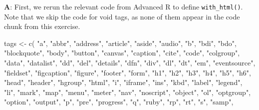 \documentclass[
]{krantz}
\makeatletter
\newenvironment{Shaded}{\begin{snugshade}}{\end{snugshade}}
\newcommand{\KeywordTok}[1]{\textcolor[rgb]{0.13,0.29,0.53}{\textbf{#1}}}
\newcommand{\NormalTok}[1]{#1}
\newcommand{\StringTok}[1]{\textcolor[rgb]{0.31,0.60,0.02}{#1}}
\newenvironment{kframe}{%
\medskip{}
\setlength{\fboxsep}{.8em}
 \def\at@end@of@kframe{}%
 \ifinner\ifhmode%
  \def\at@end@of@kframe{\end{minipage}}%
  \begin{minipage}{\columnwidth}%
 \fi\fi%
 \def\FrameCommand##1{\hskip\@totalleftmargin \hskip-\fboxsep
 \colorbox{shadecolor}{##1}\hskip-\fboxsep
     \hskip-\linewidth \hskip-\@totalleftmargin \hskip\columnwidth}%
 \MakeFramed {\advance\hsize-\width
   \@totalleftmargin\z@ \linewidth\hsize
   \@setminipage}}%
 {\par\unskip\endMakeFramed%
 \at@end@of@kframe}
\renewenvironment{Shaded}{\begin{kframe}}{\end{kframe}}
\renewcommand{\KeywordTok} [1]{\textcolor[rgb]{0.00,0.44,0.13}{{#1}}}
\renewcommand{\StringTok}  [1]{\textcolor[rgb]{0.25,0.44,0.63}{{#1}}}
\renewcommand{\NormalTok}  [1]{{#1}}
\makeatother
\begin{document}
\textbf{{A}}: First, we rerun the relevant code from Advanced R to define \texttt{with\_html()}. Note that we skip the code for void tags, as none of them appear in the code chunk from this exercise.

\begin{Shaded}
\begin{Highlighting}[]
\NormalTok{tags <-}\StringTok{ }\KeywordTok{c}\NormalTok{(}
  \StringTok{"a"}\NormalTok{, }\StringTok{"abbr"}\NormalTok{, }\StringTok{"address"}\NormalTok{, }\StringTok{"article"}\NormalTok{, }\StringTok{"aside"}\NormalTok{, }\StringTok{"audio"}\NormalTok{,}
  \StringTok{"b"}\NormalTok{, }\StringTok{"bdi"}\NormalTok{, }\StringTok{"bdo"}\NormalTok{, }\StringTok{"blockquote"}\NormalTok{, }\StringTok{"body"}\NormalTok{, }\StringTok{"button"}\NormalTok{, }\StringTok{"canvas"}\NormalTok{,}
  \StringTok{"caption"}\NormalTok{, }\StringTok{"cite"}\NormalTok{, }\StringTok{"code"}\NormalTok{, }\StringTok{"colgroup"}\NormalTok{, }\StringTok{"data"}\NormalTok{, }\StringTok{"datalist"}\NormalTok{,}
  \StringTok{"dd"}\NormalTok{, }\StringTok{"del"}\NormalTok{, }\StringTok{"details"}\NormalTok{, }\StringTok{"dfn"}\NormalTok{, }\StringTok{"div"}\NormalTok{, }\StringTok{"dl"}\NormalTok{, }\StringTok{"dt"}\NormalTok{, }\StringTok{"em"}\NormalTok{,}
  \StringTok{"eventsource"}\NormalTok{, }\StringTok{"fieldset"}\NormalTok{, }\StringTok{"figcaption"}\NormalTok{, }\StringTok{"figure"}\NormalTok{, }\StringTok{"footer"}\NormalTok{,}
  \StringTok{"form"}\NormalTok{, }\StringTok{"h1"}\NormalTok{, }\StringTok{"h2"}\NormalTok{, }\StringTok{"h3"}\NormalTok{, }\StringTok{"h4"}\NormalTok{, }\StringTok{"h5"}\NormalTok{, }\StringTok{"h6"}\NormalTok{, }\StringTok{"head"}\NormalTok{, }\StringTok{"header"}\NormalTok{,}
  \StringTok{"hgroup"}\NormalTok{, }\StringTok{"html"}\NormalTok{, }\StringTok{"i"}\NormalTok{, }\StringTok{"iframe"}\NormalTok{, }\StringTok{"ins"}\NormalTok{, }\StringTok{"kbd"}\NormalTok{, }\StringTok{"label"}\NormalTok{,}
  \StringTok{"legend"}\NormalTok{, }\StringTok{"li"}\NormalTok{, }\StringTok{"mark"}\NormalTok{, }\StringTok{"map"}\NormalTok{, }\StringTok{"menu"}\NormalTok{, }\StringTok{"meter"}\NormalTok{, }\StringTok{"nav"}\NormalTok{,}
  \StringTok{"noscript"}\NormalTok{, }\StringTok{"object"}\NormalTok{, }\StringTok{"ol"}\NormalTok{, }\StringTok{"optgroup"}\NormalTok{, }\StringTok{"option"}\NormalTok{, }\StringTok{"output"}\NormalTok{,}
  \StringTok{"p"}\NormalTok{, }\StringTok{"pre"}\NormalTok{, }\StringTok{"progress"}\NormalTok{, }\StringTok{"q"}\NormalTok{, }\StringTok{"ruby"}\NormalTok{, }\StringTok{"rp"}\NormalTok{, }\StringTok{"rt"}\NormalTok{, }\StringTok{"s"}\NormalTok{, }\StringTok{"samp"}\NormalTok{,}

\end{Highlighting}
\end{Shaded}
\end{document}
